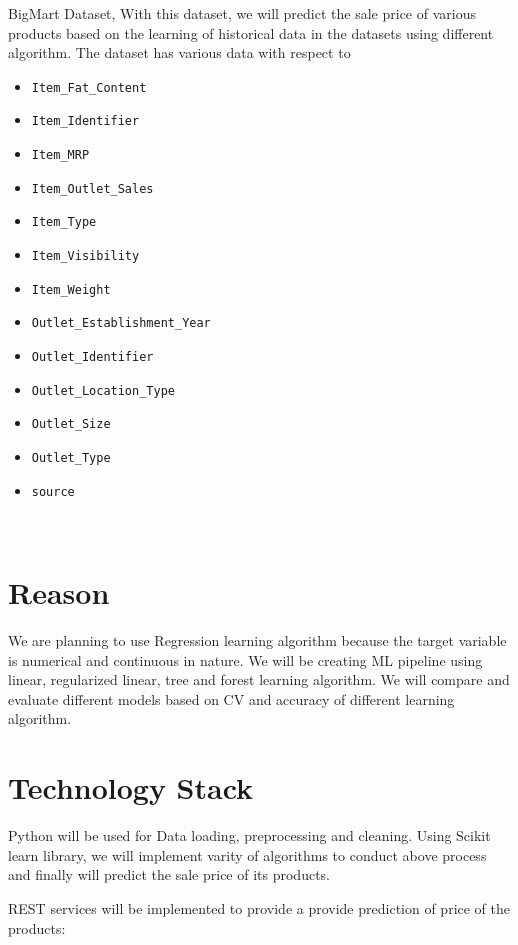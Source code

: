 BigMart Dataset, With this dataset, we will predict the sale price of various products based 
on the learning of historical data in the datasets using different algorithm. The dataset has 
various data with respect to
\begin{itemize}
\item \verb|Item_Fat_Content|
\item \verb|Item_Identifier|
\item \verb|Item_MRP|
\item \verb|Item_Outlet_Sales|
\item \verb|Item_Type|
\item \verb|Item_Visibility|
\item \verb|Item_Weight|
\item \verb|Outlet_Establishment_Year|
\item \verb|Outlet_Identifier|
\item \verb|Outlet_Location_Type|
\item \verb|Outlet_Size|
\item \verb|Outlet_Type|
\item \verb|source|
\end{itemize}
~\cite{kaggleds}

\section{Reason}

We are planning to use Regression learning algorithm because the target variable is 
numerical and continuous in nature. We will be creating ML pipeline using linear, 
regularized linear, tree and forest learning algorithm. We will compare and evaluate 
different models based on CV and accuracy of different learning algorithm.

\section{Technology Stack}

Python will be used for Data loading, preprocessing and cleaning. Using Scikit learn 
library, we will implement varity of algorithms to conduct above process and finally 
will predict the sale price of its products.

REST services will be implemented to provide a provide prediction of price of the 
products:

